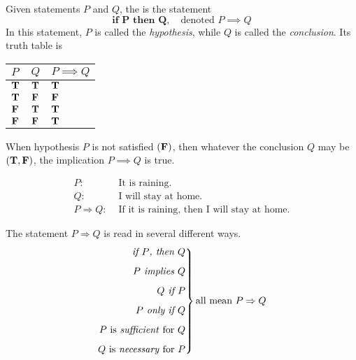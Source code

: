 \begin{definition}[Implication]
Given statements $P$ and $Q$, the  is the statement \[\textbf{if $\mathbold{P}$ then $\mathbold{Q}$},\quad \text{denoted $P \implies Q$}\]
In this statement, $P$ is called the \emph{hypothesis}, while $Q$ is called the \emph{conclusion}. Its truth table is
\begin{center}
{\renewcommand{\arraystretch}{1.5}%
\begin{tabular}{|>{\centering}m{1cm}|>{\centering}m{1cm}|>{\centering\arraybackslash}m{1.5cm}|}
\hline
\rowcolor{lightgrey}
$P$ & $Q$ & $P \implies Q$\\
\hline
$\true$ & $\true$ & $\true$\\
\hline
$\true$ & $\false$ & $\false$\\
\hline
$\false$ & $\true$ & $\true$\\
\hline
$\false$ & $\false$ & $\true$\\
\hline
\end{tabular}
}
\end{center}
When hypothesis $P$ is not satisfied $(\false)$, then whatever the conclusion $Q$ may be $(\true,\false)$, the implication $P \implies Q$ is true.
\end{definition}


\begin{example}
\begin{align*}
P:&\text{ It is raining.}\\[0.5em]
Q:&\text{ I will stay at home.}\\[0.5em]
P\Rightarrow Q:&\text{ If it is raining, then I will stay at home.}
\end{align*}
\end{example}

\vspace*{1em}

\begin{definition}
The statement $P \Rightarrow Q$ is read in several different ways.
\begin{equation*}
  \left.\begin{aligned}
  \text{\emph{if $P$, then $Q$}}\\[0.5em]
  \text{\emph{$P$ implies $Q$}}\\[0.5em]
  \text{\emph{$Q$ if $P$}}\\[0.5em]
  \text{\emph{$P$ only if $Q$}}\\[0.5em]
  \text{$P$ is \emph{sufficient} for $Q$}\\[0.5em]
  \text{$Q$ is \emph{necessary} for $P$}\\
\end{aligned}\right\}\text{all mean $P \implies Q$}
\end{equation*}
\end{definition}

